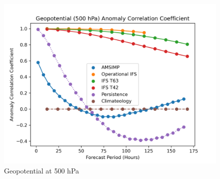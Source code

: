 \begin{figure}[H]
    \centering
    \includegraphics[width=.7\linewidth]{Plots/Results/Geopotential/anomaly_correlation_coefficient.png}
    \caption{Geopotential at 500 hPa}
\end{figure}
